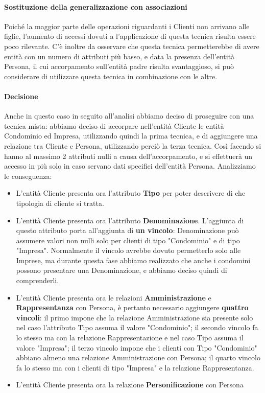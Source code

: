 \documentclass{elegantbook}
\begin{document}
			\paragraph{Sostituzione della generalizzazione con associazioni}
				Poiché la maggior parte delle operazioni riguardanti i Clienti non arrivano alle figlie, l'aumento di accessi dovuti a l'applicazione di questa tecnica risulta essere poco rilevante. C'è inoltre da osservare che questa tecnica permetterebbe di avere entità con un numero di attributi più basso, e data la presenza dell'entità Persona, il cui accorpamento sull'entità padre risulta svantaggioso, si può considerare di utilizzare questa tecnica in combinazione con le altre.
			
			\paragraph{Decisione}
			Anche in questo caso in seguito all'analisi abbiamo deciso di proseguire con una tecnica mista: abbiamo deciso di accorpare nell'entità Cliente le entità Condominio ed Impresa, utilizzando quindi la prima tecnica, e di aggiungere una relazione tra Cliente e Persona, utilizzando perciò la terza tecnica. Così facendo si hanno al massimo 2 attributi nulli a causa dell'accorpamento, e si effettuerà un accesso in più solo in caso servano dati specifici dell'entità Persona.
			Analizziamo le conseguenza:
			\begin{itemize}
				\item L'entità Cliente presenta ora l'attributo \textbf{Tipo} per poter descrivere di che tipologia di cliente si tratta.
				\item L'entità Cliente presenta ora l'attributo \textbf{Denominazione}. L'aggiunta di questo attributo porta all'aggiunta di \textbf{un vincolo}: Denominazione può assumere valori non nulli solo per clienti di tipo "Condominio" e di tipo "Impresa". Normalmente il vincolo avrebbe dovuto permetterlo solo alle Imprese, ma durante questa fase abbiamo realizzato che anche i condomini possono presentare una Denominazione, e abbiamo deciso quindi di comprenderli.
				\item L'entità Cliente presenta ora le relazioni \textbf{Amministrazione} e \textbf{Rappresentanza} con Persona, è pertanto necessario aggiungere \textbf{quattro vincoli}: il primo impone che la relazione Amministrazione sia presente solo nel caso l'attributo Tipo assuma il valore "Condominio"; il secondo vincolo fa lo stesso ma con la relazione Rappresentazione e nel caso Tipo assuma il valore "Impresa"; il terzo vincolo impone che i clienti con Tipo "Condominio" abbiano almeno una relazione Amministrazione con Persona; il quarto vincolo fa lo stesso ma con i clienti di tipo "Impresa" e la relazione Rappresentanza.
				\item L'entità Cliente presenta ora la relazione \textbf{Personificazione} con Persona
			\end{itemize}
\end{document}

